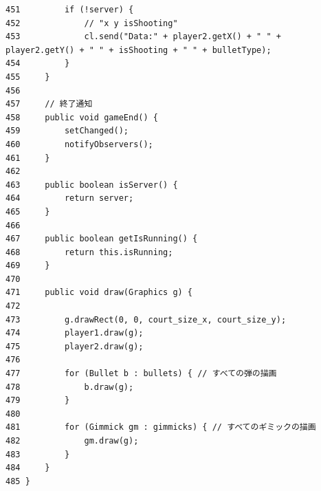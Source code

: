 \documentclass[11pt,a4j]{jarticle}
\begin{document}
\begin{small}
\begin{verbatim}
451         if (!server) {
452             // "x y isShooting"
453             cl.send("Data:" + player2.getX() + " " + player2.getY() + " " + isShooting + " " + bulletType);
454         }
455     }
456 
457     // 終了通知
458     public void gameEnd() {
459         setChanged();
460         notifyObservers();
461     }
462 
463     public boolean isServer() {
464         return server;
465     }
466 
467     public boolean getIsRunning() {
468         return this.isRunning;
469     }
470 
471     public void draw(Graphics g) {
472 
473         g.drawRect(0, 0, court_size_x, court_size_y);
474         player1.draw(g);
475         player2.draw(g);
476 
477         for (Bullet b : bullets) { // すべての弾の描画
478             b.draw(g);
479         }
480 
481         for (Gimmick gm : gimmicks) { // すべてのギミックの描画
482             gm.draw(g);
483         }
484     }
485 }
\end{verbatim}
\end{small}
\end{document}
